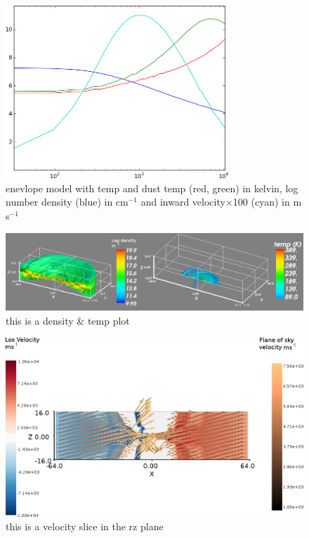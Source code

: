 \documentclass[useAMS,usenatbib]{mn2e}
\begin{document}
\begin{figure}
 \includegraphics[width=84mm]{Figures/model/L1544model_used.png}

 \caption{enevlope model with temp and dust temp (red, green) in kelvin, log number density (blue) in cm$^{-1}$ and inward velocity$\times$100 (cyan) in m$\,$s$^{-1}$}
\end{figure}

\begin{figure}
 \includegraphics[width=168mm]{Figures/model/rhoT.png}

 \caption{this is a density \& temp plot}
\end{figure}

\begin{figure}
 \includegraphics[width=168mm]{Figures/model/velocity_rzSlice_thetaColourScale2.png}

 \caption{this is a velocity slice in the rz plane}
\end{figure}
\end{document}
